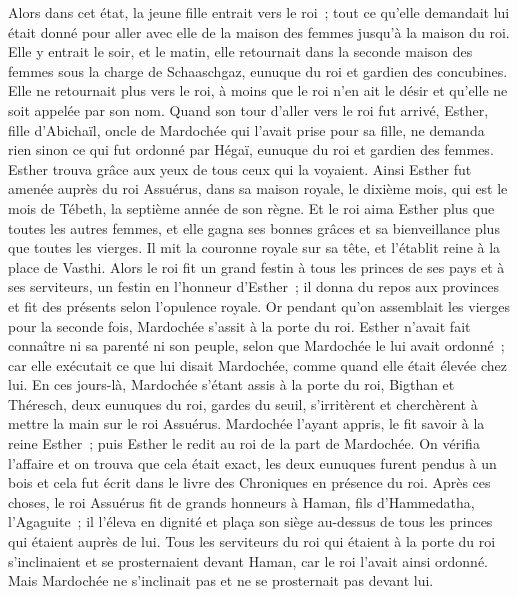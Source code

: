 \begin{multicols}{2}
 Alors dans cet état, la jeune fille entrait vers le roi~; tout ce qu'elle demandait lui était donné pour aller avec elle de la maison des femmes jusqu'à la maison du roi.
Elle y entrait le soir, et le matin, elle retournait dans la seconde maison des femmes sous la charge de Schaaschgaz, eunuque du roi et gardien des concubines. Elle ne retournait plus vers le roi, à moins que le roi n'en ait le désir et qu'elle ne soit appelée par son nom.
Quand son tour d'aller vers le roi fut arrivé, Esther, fille d'Abichaïl, oncle de Mardochée qui l'avait prise pour sa fille, ne demanda rien sinon ce qui fut ordonné par Hégaï, eunuque du roi et gardien des femmes. Esther trouva grâce aux yeux de tous ceux qui la voyaient.
Ainsi Esther fut amenée auprès du roi Assuérus, dans sa maison royale, le dixième mois, qui est le mois de Tébeth, la septième année de son règne.
Et le roi aima Esther plus que toutes les autres femmes, et elle gagna ses bonnes grâces et sa bienveillance plus que toutes les vierges. Il mit la couronne royale sur sa tête, et l'établit reine à la place de Vasthi.
Alors le roi fit un grand festin à tous les princes de ses pays et à ses serviteurs, un festin en l'honneur d'Esther~; il donna du repos aux provinces et fit des présents selon l'opulence royale.
Or pendant qu'on assemblait les vierges pour la seconde fois, Mardochée s'assit à la porte du roi.
Esther n'avait fait connaître ni sa parenté ni son peuple, selon que Mardochée le lui avait ordonné~; car elle exécutait ce que lui disait Mardochée, comme quand elle était élevée chez lui.
En ces jours-là, Mardochée s'étant assis à la porte du roi, Bigthan et Théresch, deux eunuques du roi, gardes du seuil, s'irritèrent et cherchèrent à mettre la main sur le roi Assuérus.
Mardochée l'ayant appris, le fit savoir à la reine Esther~; puis Esther le redit au roi de la part de Mardochée.
On vérifia l'affaire et on trouva que cela était exact, les deux eunuques furent pendus à un bois et cela fut écrit dans le livre des Chroniques en présence du roi.
\VerseOne{}Après ces choses, le roi Assuérus fit de grands honneurs à Haman, fils d'Hammedatha, l'Agaguite~; il l'éleva en dignité et plaça son siège au-dessus de tous les princes qui étaient auprès de lui.
Tous les serviteurs du roi qui étaient à la porte du roi s'inclinaient et se prosternaient devant Haman, car le roi l'avait ainsi ordonné. Mais Mardochée ne s'inclinait pas et ne se prosternait pas devant lui.

\end{multicols}
